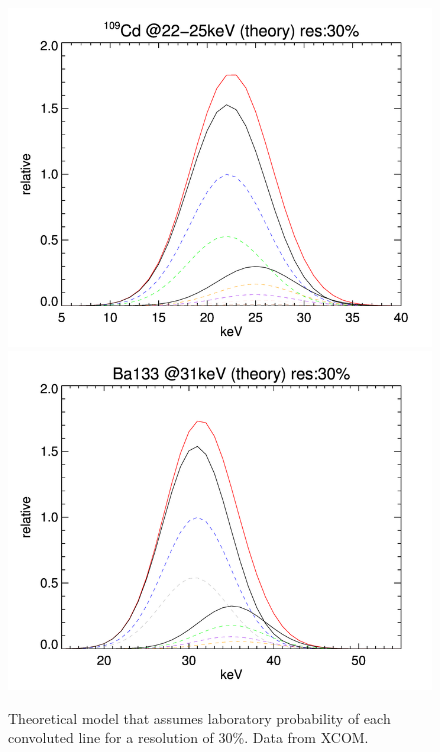 \documentclass[10pt,a4paper, openany]{book}
\begin{document}
\begin{figure}[!h]
\begin{center}
\includegraphics[scale=0.2]{imm/22kev_gauss.png}
\includegraphics[scale=0.2]{imm/31kev_gauss.png}
\end{center}
\caption{Theoretical model that assumes laboratory probability of each convoluted line for a resolution of 30\%. Data from XCOM.}
\label{fig:th}
\end{figure}
\end{document}
